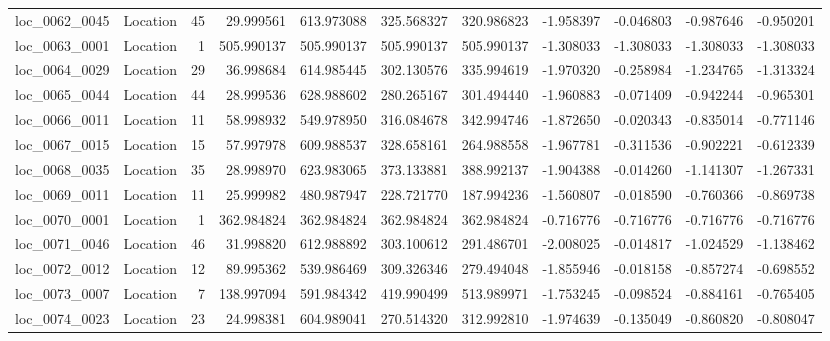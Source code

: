\begin{tabular}{llrrrrrrrrr}
loc_0062_0045 &        Location &              45 &  29.999561 & 613.973088 &  325.568327 &    320.986823 &  -1.958397 &  -0.046803 &   -0.987646 &     -0.950201 \\
loc_0063_0001 &        Location &               1 & 505.990137 & 505.990137 &  505.990137 &    505.990137 &  -1.308033 &  -1.308033 &   -1.308033 &     -1.308033 \\
loc_0064_0029 &        Location &              29 &  36.998684 & 614.985445 &  302.130576 &    335.994619 &  -1.970320 &  -0.258984 &   -1.234765 &     -1.313324 \\
loc_0065_0044 &        Location &              44 &  28.999536 & 628.988602 &  280.265167 &    301.494440 &  -1.960883 &  -0.071409 &   -0.942244 &     -0.965301 \\
loc_0066_0011 &        Location &              11 &  58.998932 & 549.978950 &  316.084678 &    342.994746 &  -1.872650 &  -0.020343 &   -0.835014 &     -0.771146 \\
loc_0067_0015 &        Location &              15 &  57.997978 & 609.988537 &  328.658161 &    264.988558 &  -1.967781 &  -0.311536 &   -0.902221 &     -0.612339 \\
loc_0068_0035 &        Location &              35 &  28.998970 & 623.983065 &  373.133881 &    388.992137 &  -1.904388 &  -0.014260 &   -1.141307 &     -1.267331 \\
loc_0069_0011 &        Location &              11 &  25.999982 & 480.987947 &  228.721770 &    187.994236 &  -1.560807 &  -0.018590 &   -0.760366 &     -0.869738 \\
loc_0070_0001 &        Location &               1 & 362.984824 & 362.984824 &  362.984824 &    362.984824 &  -0.716776 &  -0.716776 &   -0.716776 &     -0.716776 \\
loc_0071_0046 &        Location &              46 &  31.998820 & 612.988892 &  303.100612 &    291.486701 &  -2.008025 &  -0.014817 &   -1.024529 &     -1.138462 \\
loc_0072_0012 &        Location &              12 &  89.995362 & 539.986469 &  309.326346 &    279.494048 &  -1.855946 &  -0.018158 &   -0.857274 &     -0.698552 \\
loc_0073_0007 &        Location &               7 & 138.997094 & 591.984342 &  419.990499 &    513.989971 &  -1.753245 &  -0.098524 &   -0.884161 &     -0.765405 \\
loc_0074_0023 &        Location &              23 &  24.998381 & 604.989041 &  270.514320 &    312.992810 &  -1.974639 &  -0.135049 &   -0.860820 &     -0.808047 \\

\end{tabular}
